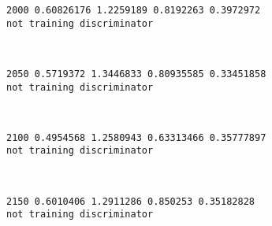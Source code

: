 \documentclass[11pt]{article}
\begin{document}
    \begin{Verbatim}[commandchars=\\\{\}]
2000 0.60826176 1.2259189 0.8192263 0.3972972
not training discriminator

    \end{Verbatim}

    \begin{center}
    \end{center}
    { \hspace*{\fill} \\}
    
    \begin{Verbatim}[commandchars=\\\{\}]
2050 0.5719372 1.3446833 0.80935585 0.33451858
not training discriminator

    \end{Verbatim}

    \begin{center}
    \end{center}
    { \hspace*{\fill} \\}
    
    \begin{Verbatim}[commandchars=\\\{\}]
2100 0.4954568 1.2580943 0.63313466 0.35777897
not training discriminator

    \end{Verbatim}

    \begin{center}
    \end{center}
    { \hspace*{\fill} \\}
    
    \begin{Verbatim}[commandchars=\\\{\}]
2150 0.6010406 1.2911286 0.850253 0.35182828
not training discriminator

    \end{Verbatim}

    \begin{center}
    \end{center}
    { \hspace*{\fill} \\}
    
\end{document}
